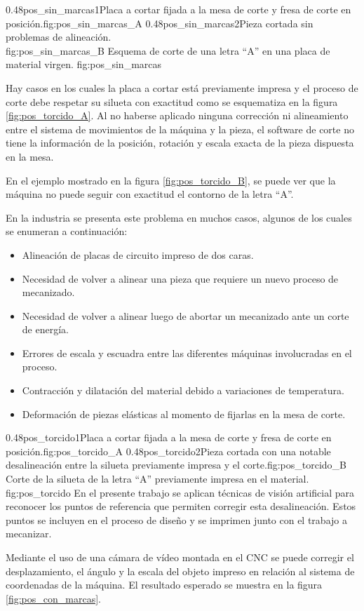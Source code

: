 \subfigab
         {0.48}{pos_sin_marcas1}{Placa a cortar fijada a la mesa de corte y fresa de corte en posición.}{fig:pos_sin_marcas_A}
         {0.48}{pos_sin_marcas2}{Pieza cortada sin problemas de alineación.\\ \vphantom{1}}{fig:pos_sin_marcas_B}
         {Esquema de corte de una letra ``A'' en una placa de material virgen.}
         {fig:pos_sin_marcas}

         Hay casos en los cuales la placa a cortar está previamente impresa y el proceso de corte debe respetar su silueta con exactitud como se esquematiza en la figura \ref{fig:pos_torcido_A}.
         Al no haberse aplicado ninguna corrección ni alineamiento entre el sistema de movimientos de la máquina y la pieza, el software de corte no tiene la información de la posición, rotación y escala exacta de la pieza dispuesta en la mesa. \par

\pagebreak %

         En el ejemplo mostrado en la figura \ref{fig:pos_torcido_B}, se puede ver que la máquina no puede seguir con exactitud el contorno de la letra ``A''.\par
         En la industria se presenta este problema en muchos casos, algunos de los cuales se enumeran a continuación:

\begin{itemize}
   \item{Alineación de placas de circuito impreso de dos caras.}
   \item{Necesidad de volver a alinear una pieza que requiere un nuevo proceso de mecanizado.}
   \item{Necesidad de volver a alinear luego de abortar un mecanizado ante un corte de energía.}
   \item{Errores de escala y escuadra entre las diferentes máquinas involucradas en el proceso.}
   \item{Contracción y dilatación del material debido a variaciones de temperatura.}
   \item{Deformación de piezas elásticas al momento de fijarlas en la mesa de corte.}
\end{itemize}


\subfigab
         {0.48}{pos_torcido1}{Placa a cortar fijada a la mesa de corte y fresa de corte en posición.}{fig:pos_torcido_A}
         {0.48}{pos_torcido2}{Pieza cortada con una notable desalineación entre la silueta previamente impresa y el corte.}{fig:pos_torcido_B}
         {Corte de la silueta de la letra ``A'' previamente impresa en el material.}
         {fig:pos_torcido}
         En el presente trabajo se aplican técnicas de visión artificial para reconocer los puntos de referencia que permiten corregir esta desalineación.
         Estos puntos se incluyen en el proceso de diseño y se imprimen junto con el trabajo a mecanizar.\par
         Mediante el uso de una cámara de vídeo montada en el CNC se puede corregir el desplazamiento, el ángulo y la escala del objeto impreso en relación al sistema de coordenadas de la máquina.
         El resultado esperado se muestra en la figura \ref{fig:pos_con_marcas}.

